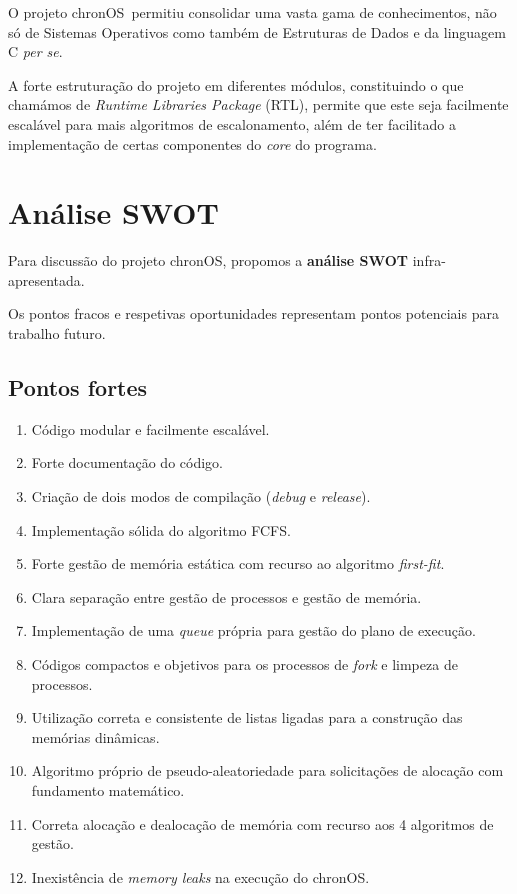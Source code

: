 \documentclass[10pt,oneside]{estiloUBI}
\newcommand{\chronOS}{\textsf{chronOS}}
\begin{document}
	O projeto \chronOS~permitiu consolidar uma vasta gama de conhecimentos, não só de Sistemas Operativos como também de Estruturas de Dados e da linguagem C \textit{per se}.
	
	A forte estruturação do projeto em diferentes módulos, constituindo o que chamámos de \textit{Runtime Libraries Package} (RTL), permite que este seja facilmente escalável para mais algoritmos de escalonamento, além de ter facilitado a implementação de certas componentes do \textit{core} do programa.
	
	
	\section{Análise SWOT}
	
	Para discussão do projeto \chronOS, propomos a \textbf{análise SWOT} infra-apresentada.
	
	Os pontos fracos e respetivas oportunidades representam pontos potenciais para trabalho futuro.
	
	\subsection{Pontos fortes}
	
	\begin{enumerate}
		\item Código modular e facilmente escalável.
		\item Forte documentação do código.
		\item Criação de dois modos de compilação (\textit{debug} e \textit{release}).
		\item Implementação sólida do algoritmo \ac{FCFS}.
		\item Forte gestão de memória estática com recurso ao algoritmo \textit{first-fit}.
		\item Clara separação entre gestão de processos e gestão de memória.
		\item Implementação de uma \textit{queue} própria para gestão do plano de execução.
		\item Códigos compactos e objetivos para os processos de \textit{fork} e limpeza de processos.
		\item Utilização correta e consistente de listas ligadas para a construção das memórias dinâmicas.
		\item Algoritmo próprio de pseudo-aleatoriedade para solicitações de alocação com fundamento matemático.
		\item Correta alocação e dealocação de memória com recurso aos 4 algoritmos de gestão.
		\item Inexistência de \textit{memory leaks} na execução do \chronOS.
	\end{enumerate}
	
\end{document}
